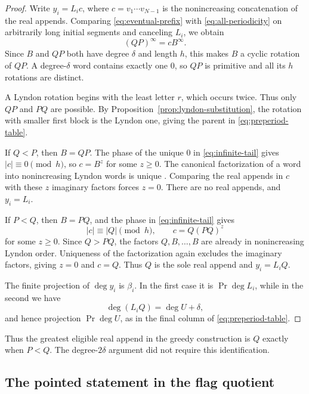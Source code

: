 \documentclass[11pt]{amsart}
\numberwithin{equation}{section}
\theoremstyle{definition}
\DeclareMathOperator{\Prj}{Pr}
\begin{document}
\begin{proof}
Write $y_i=L_ic$, where $c=v_1\cdots v_{N-1}$ is the nonincreasing concatenation of the real appends. Comparing \eqref{eq:eventual-prefix} with \eqref{eq:all-periodicity} on arbitrarily long initial segments and canceling $L_i$, we obtain
\begin{equation}\label{eq:infinite-tail}
 (QP)^{\infty}=cB^{\infty}.
\end{equation}
Since $B$ and $QP$ both have degree $\delta$ and length $h$, this makes $B$ a cyclic rotation of $QP$. A degree-$\delta$ word contains exactly one $0$, so $QP$ is primitive and all its $h$ rotations are distinct.

A Lyndon rotation begins with the least letter $r$, which occurs twice. Thus only $QP$ and $PQ$ are possible. By Proposition~\ref{prop:lyndon-substitution}, the rotation with smaller first block is the Lyndon one, giving the parent in \eqref{eq:preperiod-table}.

If $Q<P$, then $B=QP$. The phase of the unique $0$ in \eqref{eq:infinite-tail} gives $|c|\equiv0\pmod h$, so $c=B^z$ for some $z\geq0$. The canonical factorization of a word into nonincreasing Lyndon words is unique \cite[Proposition~2.7]{ETC}. Comparing the real appends in $c$ with these $z$ imaginary factors forces $z=0$. There are no real appends, and $y_i=L_i$.

If $P<Q$, then $B=PQ$, and the phase in \eqref{eq:infinite-tail} gives
\[
 |c|\equiv|Q|\pmod h,
 \qquad c=Q(PQ)^z
\]
for some $z\geq0$. Since $Q>PQ$, the factors $Q,B,\ldots,B$ are already in nonincreasing Lyndon order. Uniqueness of the factorization again excludes the imaginary factors, giving $z=0$ and $c=Q$. Thus $Q$ is the sole real append and $y_i=L_iQ$.

The finite projection of $\deg y_i$ is $\beta_i$. In the first case it is $\Prj\deg L_i$, while in the second we have
\[
 \deg(L_iQ)=\deg U+\delta,
\]
and hence projection $\Prj\deg U$, as in the final column of \eqref{eq:preperiod-table}.
\end{proof}

Thus the greatest eligible real append in the greedy construction is $Q$ exactly when $P<Q$. The degree-$2\delta$ argument did not require this identification.

\subsection{The pointed statement in the flag quotient}\label{subsec:filtered}
\end{document}
